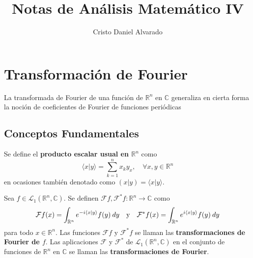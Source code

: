 \documentclass[12pt]{report}
\theoremstyle{largebreak}
\newcommand\cf[3]{\ensuremath{#1:#2\rightarrow#3}}
\newcommand\pint[2]{\ensuremath{\langle#1| #2\rangle}}
\begin{document}
    \setlength{\parskip}{5pt} %
    \setlength{\parindent}{12pt} %
    \title{Notas de Análisis Matemático IV}
    \author{Cristo Daniel Alvarado}
    \maketitle

    \tableofcontents %

    
    \setcounter{chapter}{3}

    \chapter{Transformación de Fourier}
    
    La transformada de Fourier de una función de $\mathbb{R}^n$ en $\mathbb{C}$ generaliza en cierta forma la noción de coeficientes de Fourier de funciones periódicas
    
    \section{Conceptos Fundamentales}

    \begin{mydef}
        Se define el \textbf{producto escalar usual en $\mathbb{R}^n$} como
        \begin{equation}
            \label{tf:pint}
            \pint{x}{y}=\sum_{ k=1}^n x_ky_x,\quad\forall x,y\in\mathbb{R}^n
        \end{equation}
        en ocasiones también denotado como $(x|y)=\pint{x}{y}$.
    \end{mydef}

    \begin{mydef}
        Sea $f\in\mathcal{L}_1(\mathbb{R}^n,\mathbb{C})$. Se definen $\cf{\mathcal{F}f,\mathcal{F}^*f}{\mathbb{R}^n}{\mathbb{C}} $ como
        \begin{equation}
            \label{tf:def}
            \mathcal{F}f(x)=\int_{ \mathbb{R}^n}e^{ -i\pint{x}{y}}f(y)\:dy\quad\textup{y}\quad\mathcal{F}^*f(x)=\int_{ \mathbb{R}^n}e^{i\pint{x}{y}}f(y)\:dy
        \end{equation}
        para todo $x\in\mathbb{R}^n$. Las funciones $\mathcal{F}f$ y $\mathcal{F}^*f$ se llaman las \textbf{transformaciones de Fourier de $f$}. Las aplicaciones $\mathcal{F}$ y $\mathcal{F}^*$ de $\mathcal{L}_1(\mathbb{R}^n,\mathbb{C})$ en el conjunto de funciones de $\mathbb{R}^n$ en $\mathbb{C}$ se llaman las \textbf{transformaciones de Fourier}.
    \end{mydef}
\end{document}
